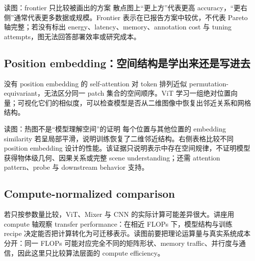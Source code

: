 
\begin{knowledgebox}{读图：frontier 只比较被画出的方案}
散点图上“更上方”代表更高 accuracy，“更右侧”通常代表更多数据或规模。Frontier 表示在已报告方案中较优，不代表 Pareto 轴完整；若没有标出 energy、latency、memory、annotation cost 与 tuning attempts，图无法回答部署效率或研究成本。
\end{knowledgebox}

\subsection{Position embedding：空间结构是学出来还是写进去}

没有 position embedding 的 self-attention 对 token 排列近似 permutation-equivariant，无法区分同一 patch 集合的空间顺序。ViT 学习一组绝对位置向量；可视化它们的相似度，可以检查模型是否从二维图像中恢复出邻近关系和网格结构。


\begin{knowledgebox}{读图：热图不是“模型理解空间”的证明}
每个位置与其他位置的 embedding similarity 若呈局部平滑，说明训练恢复了二维邻近结构。右侧表格比较不同 position embedding 设计的性能。该证据只说明表示中存在空间规律，不证明模型获得物体级几何、因果关系或完整 scene understanding；还需 attention pattern、probe 与 downstream behavior 支持。
\end{knowledgebox}


\subsection{Compute-normalized comparison}

若只按参数量比较，ViT、Mixer 与 CNN 的实际计算可能差异很大。讲座用 compute 轴观察 transfer performance：在相近 FLOPs 下，模型结构与训练 recipe 决定能否把计算转化为可迁移表示。读图前要把理论运算量与真实系统成本分开：同一 FLOPs 可能对应完全不同的矩阵形状、memory traffic、并行度与通信，因此这里只比较算法层面的 compute efficiency。

